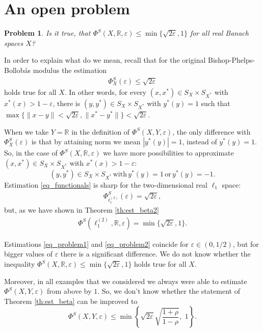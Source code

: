\documentclass[11pt,a4paper]{amsart}
\newcommand{\R}{{\mathbb{R}}}
\newcommand{\eps}{\varepsilon}
\numberwithin{equation}{section}
\theoremstyle{plain}
\newtheorem{probl}[theorem]{Problem}
\theoremstyle{definition}
\renewcommand{\leq}{\leqslant}
\begin{document}
\section{An open problem} \label{sec5}

\begin{probl}
Is it true, that $\Phi^S(X,\R,\varepsilon)\leq\min\{\sqrt{2\varepsilon}, 1\}$ for all real Banach spaces $X$?
\end{probl}
 
 In order to explain what do we mean, recall that for the original Bishop-Phelps-Bollob\'{a}s modulus the estimation 
\begin{align}\label{eq_functionals}
\Phi_X^S(\varepsilon)\leq\sqrt{2\varepsilon}
\end{align}
holds true for all $X$. In other words, for every $(x,x^*)\in S_X\times S_{X^*}$ with $x^*(x)>1-\eps$, there is $(y,y^*)\in S_X\times S_{X^*}$ with $y^*(y)=1$ such that
$\max\{\|x-y\|<\sqrt{2\varepsilon}, \|x^*-y^*\|\}<\sqrt{2\varepsilon}$.

When we take $Y=\R$ in the definition of $\Phi^S(X, Y, \varepsilon)$, the only difference with 
$\Phi_X^S(\varepsilon)$ is that by attaining norm we mean $|y^*(y)|=1$,
instead of $y^*(y)=1$.  So, in the case of $\Phi^S(X,\R,\varepsilon)$ we have more possibilities to approximate  $(x,x^*)\in S_X\times S_{X^*}$ with $x^*(x) >1-\eps$: 
$$(y,y^*)\in S_X\times S_{X^*} \,\text{with}\, y^*(y)=1 \,\text{or}\, y^*(y)=-1.$$
Estimation \eqref{eq_functionals} is sharp for the two-dimensional real $\ell_1$ space:
\begin{align}\label{eq_problem1}
\Phi_{\ell^{(2)}_1}^S(\varepsilon)=\sqrt{2\varepsilon},
\end{align}
but, as we have shown in Theorem \ref{th:est_beta2}  
\begin{align}\label{eq_problem2}
\Phi^S(\ell^{(2)}_1,\R,\varepsilon)=\min\{\sqrt{2\varepsilon}, 1\}.
\end{align}

Estimations \eqref{eq_problem1} and \eqref{eq_problem2} coincide for $\eps\in (0, 1/2)$, but for bigger values of $\eps$ there is a significant difference. We do not know whether the inequality $\Phi^S(X,\R,\varepsilon)\leq\min\{\sqrt{2\varepsilon}, 1\}$ holds true for all $X$. 

Moreover, in all examples that we considered we always were able to estimate $\Phi^S(X, Y, \eps)$ from above by $1$. So, we don't know whether the statement of Theorem \ref{th:est_beta} can be improved to  
$$\Phi^S(X,Y,\varepsilon)\leq\min\left\{ \sqrt{2\varepsilon}\sqrt{\frac{1+\rho}{1-\rho}},\,\, 1\right\}.$$
\end{document}
